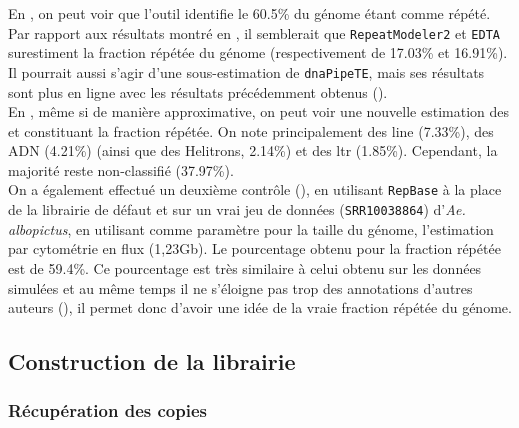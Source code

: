 \documentclass[10pt]{article}
\begin{document}
\bigskip

En , on peut voir que l'outil identifie le 60.5\% du génome étant comme répété.
Par rapport aux résultats montré en \tableautorefname{ \ref{tab:results_annotation}}, il semblerait que \texttt{RepeatModeler2} et \texttt{EDTA} surestiment la fraction répétée du génome (respectivement de 17.03\% et 16.91\%). Il pourrait aussi s'agir d'une sous-estimation de \texttt{dnaPipeTE}, mais ses résultats sont plus en ligne avec les résultats précédemment obtenus (\tableautorefname{ \ref{tab:annot_state_of_art}}). \\
En , même si de manière approximative, on peut voir une nouvelle estimation des \acrlong{et} constituant la fraction répétée. On note principalement des \acrshort{line} (7.33\%), des ADN (4.21\%) (ainsi que des Helitrons, 2.14\%) et des \acrshort{ltr} (1.85\%). Cependant, la majorité reste non-classifié (37.97\%). \\



On a également effectué un deuxième contrôle (\figureautorefname{ \ref{fig:repbase_realsize}}), en utilisant \texttt{RepBase} à la place de la librairie de défaut et sur un vrai jeu de données (\texttt{SRR10038864}) d'\textit{Ae. albopictus}, en utilisant comme paramètre pour la taille du génome, l'estimation par cytométrie en flux (1,23Gb). Le pourcentage obtenu pour la fraction répétée est de 59.4\%. Ce pourcentage est très similaire à celui obtenu sur les données simulées et au même temps il ne s'éloigne pas trop des annotations d'autres auteurs (\tableautorefname{ \ref{tab:annot_state_of_art}}), il permet donc d'avoir une idée de la vraie fraction répétée du génome. \\

\bigskip

\subsection{Construction de la librairie}

\subsubsection{Récupération des copies}\label{get_copies}
\end{document}
